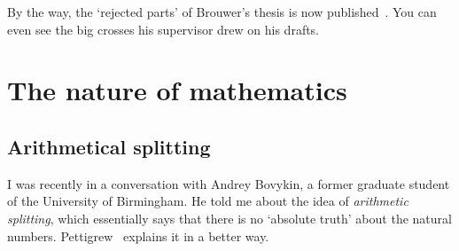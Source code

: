 \documentclass{bhamthesis}
\theoremstyle{definition}
\begin{document}
By the way, the `rejected parts' of Brouwer's thesis is now
published~\cite{art:brouwer-rej}.  You can even see the big
crosses his supervisor drew on his drafts.


\chapter{The nature of mathematics}
\section{Arithmetical splitting}
I was recently in a conversation with Andrey Bovykin, a former
graduate student of the University of Birmingham.  He told me
about the idea of \emph{arithmetic splitting}, which essentially
says that there is no `absolute truth' about the natural numbers.
Pettigrew~\cite[pp.~19--20]{unpub:uniqueIN} explains it in a
better way.
\end{document}
